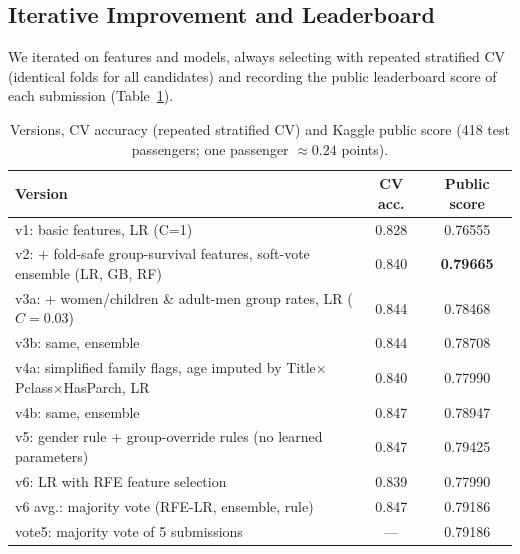 \documentclass[10pt,twocolumn]{article}
\begin{document}
\subsection{Iterative Improvement and Leaderboard}\label{sec:iter}
We iterated on features and models, always selecting with repeated stratified CV (identical folds for all candidates)
and recording the public leaderboard score of each submission (Table~\ref{tab:versions}).
\begin{table}[t]
\centering
\caption{Versions, CV accuracy (repeated stratified CV) and Kaggle public score (418 test passengers; one passenger $\approx 0.24$ points).}
\label{tab:versions}
\small
\begin{tabular}{p{3.9cm}cc}
\toprule
Version & CV acc. & Public score \\
\midrule
v1: basic features, LR (C=1) & 0.828 & 0.76555 \\
v2: + fold-safe group-survival features, soft-vote ensemble (LR, GB, RF) & 0.840 & \textbf{0.79665} \\
v3a: + women/children \& adult-men group rates, LR ($C{=}0.03$) & 0.844 & 0.78468 \\
v3b: same, ensemble & 0.844 & 0.78708 \\
v4a: simplified family flags, age imputed by Title$\times$Pclass$\times$HasParch, LR & 0.840 & 0.77990 \\
v4b: same, ensemble & 0.847 & 0.78947 \\
v5: gender rule + group-override rules (no learned parameters) & 0.847 & 0.79425 \\
v6: LR with RFE feature selection & 0.839 & 0.77990 \\
v6 avg.: majority vote (RFE-LR, ensemble, rule) & 0.847 & 0.79186 \\
vote5: majority vote of 5 submissions & --- & 0.79186 \\
\bottomrule
\end{tabular}
\end{table}
\end{document}
